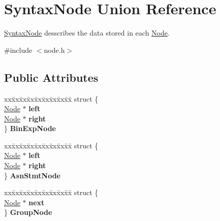 \hypertarget{union_syntax_node}{}\section{Syntax\+Node Union Reference}
\label{union_syntax_node}


\mbox{\hyperlink{union_syntax_node}{Syntax\+Node}} desscribes the data stored in each \mbox{\hyperlink{struct_node}{Node}}.  




{\ttfamily \#include $<$node.\+h$>$}

\subsection*{Public Attributes}
\begin{DoxyCompactItemize}
\item 
\mbox{\label{union_syntax_node_a293c7a07bce7cebb1b2b02184f6e86ec}} 
\begin{tabbing}
xx\=xx\=xx\=xx\=xx\=xx\=xx\=xx\=xx\=\kill
struct \{\\
\>\mbox{\hyperlink{struct_node}{Node}} $\ast$ {\bfseries left}\\
\>\mbox{\hyperlink{struct_node}{Node}} $\ast$ {\bfseries right}\\
\} {\bfseries BinExpNode}\\

\end{tabbing}\item 
\mbox{\label{union_syntax_node_a45a8e1d2ff6f81191be9a573a37f71e7}} 
\begin{tabbing}
xx\=xx\=xx\=xx\=xx\=xx\=xx\=xx\=xx\=\kill
struct \{\\
\>\mbox{\hyperlink{struct_node}{Node}} $\ast$ {\bfseries left}\\
\>\mbox{\hyperlink{struct_node}{Node}} $\ast$ {\bfseries right}\\
\} {\bfseries AsnStmtNode}\\

\end{tabbing}\item 
\mbox{\label{union_syntax_node_a686dc3844112759eeeafde6abddbc3dc}} 
\begin{tabbing}
xx\=xx\=xx\=xx\=xx\=xx\=xx\=xx\=xx\=\kill
struct \{\\
\>\mbox{\hyperlink{struct_node}{Node}} $\ast$ {\bfseries next}\\
\} {\bfseries GroupNode}\\


\end{tabbing}
\end{DoxyCompactItemize}
